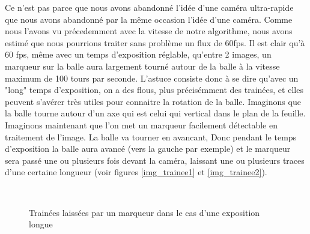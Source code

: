 Ce n'est pas parce que nous avons abandonné l'idée d'une caméra ultra-rapide que nous avons abandonné par la même occasion l'idée d'une caméra. Comme nous l'avons vu précedemment avec la vitesse de notre algorithme, nous avons estimé que nous pourrions traiter sans problème un flux de 60fps. Il est clair qu'à 60 fps, même avec un temps d'exposition réglable, qu'entre 2 images, un marqueur sur la balle aura largement tourné autour de la balle à la vitesse maximum de 100 tours par seconde. L'astuce consiste donc à se dire qu'avec un "long" temps d'exposition, on a des flous, plus précisémment des trainées, et elles peuvent s'avérer très utiles pour connaitre la rotation de la balle. Imaginons que la balle tourne autour d'un axe qui est celui qui vertical dans le plan de la feuille. Imaginons maintenant que l'on met un marqueur facilement détectable en traitement de l'image. La balle va tourner en avancant, Donc pendant le temps d'exposition la balle aura avancé (vers la gauche par exemple) et le marqueur sera passé une ou plusieurs fois devant la caméra, laissant une ou plusieurs traces d'une certaine longueur (voir figures \ref{img_trainee1} et \ref{img_trainee2}).


\begin{figure}
\centering
{}
\\
\caption{Trainées laissées par un marqueur dans le cas d'une exposition longue}
\end{figure}

